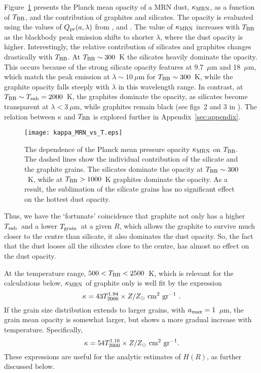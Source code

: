 \documentclass[a4paper,fleqn,usenatbib]{mnras}
\newcommand{\mic}{\mbox{$\mu$m}}
\newcommand{\Tsub}{\mbox{$T_{\rm sub}$}}
\newcommand{\Tgr}{\mbox{$T_{\rm grain}$}}
\begin{document}
Figure~\ref{fig:kappa_MRN_vs_T} presents the Planck mean opacity of a MRN dust, $\kappa_{\rm MRN}$, as a function of 
$T_{\rm BB}$, and the contribution of graphites and silicates. The opacity is evaluated using the values of $Q_{\rm pr}(a,\lambda)$ from \citet{draine_lee84}, \citet{LaorDraine93} and \citet{weingartner_draine01}. The value of $\kappa_{\rm MRN}$ increases with $T_{\rm BB}$ as the blackbody peak emission shifts to shorter $\lambda$, where the dust opacity is higher. Interestingly, the relative contribution of silicates and graphites changes drastically with $T_{\rm BB}$. At $T_{\rm BB}\sim 300$~K the silicates heavily dominate the opacity. This occurs because of the strong silicate opacity features at 9.7~$\mic$ and 18~$\mic$, which match the peak emission at 
$\lambda \sim 10~\mic$  for
$T_{\rm BB}\sim 300$~K, while the graphite opacity falls steeply with $\lambda$ in this wavelength range.  
In  contrast, at $T_{\rm BB}\sim \Tsub=2000$~K, the graphites dominate the opacity, as silicates become transparent at $\lambda<3~\mic$, while graphites remain black (see figs~2 and 3 in \citealt{LaorDraine93}). The relation between $\kappa$ and $T_{\rm BB}$ is explored further in Appendix~\ref{sec:appendix}. 


\begin{figure}
\texttt{[image: kappa\_MRN\_vs\_T.eps]}
\caption{The dependence of the Planck mean pressure opacity $\kappa_{\rm MRN}$ on 
$T_{\rm BB}$. The dashed lines show the individual contribution
of the silicate and the graphite grains. The silicates dominate the opacity at $T_{\rm BB}\sim 300$~K, while at 
$T_{\rm BB}> 1000$~K graphites dominate the opacity.
As a result, the sublimation of the silicate grains has no 
significant effect on the hottest
dust opacity.}
\label{fig:kappa_MRN_vs_T}
\end{figure}


Thus, we have the `fortunate' coincidence that graphite not only has a higher \Tsub\, and a lower \Tgr\ at a given $R$, which allows the graphite to survive much closer to the centre than silicate, it also dominates the dust opacity. So, the fact that the dust looses all the silicates close to the centre, has almost no effect on the dust opacity. 

At the temperature range, $500<T_{\rm BB}<2500$~K, which is relevant for the calculations below, 
$\kappa_{\rm MRN}$ of graphite only is well fit by the expression 
\begin{equation}
\kappa=43 T_{2000}^{1.94}\times Z/Z_{\odot}~{\rm cm}^2~{\rm gr}^{-1}\ . \label{eq:kappa}
\end{equation}
If the grain size distribution extends to larger grains, with $a_{\rm max}=1$~\mic, the grain mean opacity is somewhat larger, but shows a more gradual increase with temperature. Specifically, 
\begin{equation}
\kappa=54 T_{2000}^{1.16}\times Z/Z_{\odot}~{\rm cm}^2~{\rm gr}^{-1} . 
\label{eq:kappa1}
\end{equation}
These expressions are useful for the analytic estimates of $H(R)$, as further discussed below.
\end{document}
